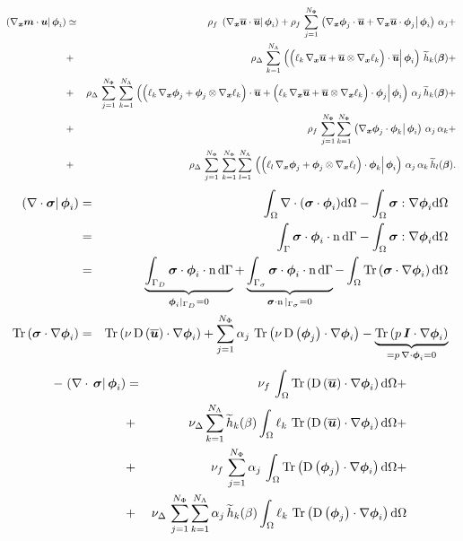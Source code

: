 \documentclass[10pt,a4paper]{article}
\begin{document}
\begin{eqnarray}
\label{eq:convection_phii}
 \prodscal{\grad_{\vx}\vec m \cdot \vu }{\vphi_i}&\simeq & \rho_f \, \prodscal{\grad_{\vx}\bu \cdot \bu}{\vphi_i} + \rho_f \, \sum_{j=1}^{N_\Phi}  \prodscal{\grad_{\vx} \vphi_j\cdot \bu + \grad_{\vx}\bu\cdot \vphi_j }{\vphi_i}
\,\alpha_j  + \\
&+& \rho_\Delta\, \sum_{k=1}^{N_\Lambda}\prodscal{\Big( \ell_k \, \grad_{\vx}\bu+ \bu\otimes\grad_{\vx}\ell_k\Big)\cdot \bu}{\vphi_i}  \, \th_k (\vec \beta)  + \\
&+& \rho_\Delta\, \sum_{j=1}^{N_\Phi} \,\sum_{k=1}^{N_\Lambda} 
 \prodscal{\Big( \ell_k \, \grad_{\vx}\vphi_j+ \vphi_j \otimes\grad_{\vx}\ell_k\Big)\cdot \bu +  \Big( \ell_k \, \grad_{\vx}\bu+ \bu\otimes\grad_{\vx}\ell_k\Big) \cdot \vphi_j }{\vphi_i}\,\alpha_j \, \th_k (\vec \beta) + \\
&+&  \rho_f \, \sum_{j=1}^{N_\Phi} \sum_{k=1}^{N_\Phi}  \prodscal{ \grad_{\vx} \vphi_j\cdot \vphi_k }{\vphi_i}\,\alpha_j \,\alpha_k  + \\
&+& \rho_\Delta\, \sum_{j=1}^{N_\Phi} \,\sum_{k=1}^{N_\Phi} \sum_{l=1}^{N_\Lambda}
\prodscal{\Big( \ell_l \, \grad_{\vx}\vphi_j+ \vphi_j \otimes\grad_{\vx}\ell_l\Big)\cdot \vphi_k }{\vphi_i}\, \alpha_j \, \alpha_k \,\th_l (\vec \beta).
\end{eqnarray}
%
%
\begin{eqnarray}
 \left.\left(\nabla\cdot\boldsymbol{\sigma} \right\vert \boldsymbol{\phi}_i\right)
 &=& \int_\Omega \nabla\cdot(\boldsymbol{\sigma}\cdot\boldsymbol{\phi}_i)\mathrm{d}\Omega - \int_\Omega\boldsymbol{\sigma}:\nabla \boldsymbol{\phi}_i \mathrm{d} \Omega \\
&=&\int_\Gamma \boldsymbol{\sigma}\cdot\boldsymbol{\phi}_i\cdot \operatorname n \mathrm{d} \Gamma- \int_\Omega\boldsymbol{\sigma}:\nabla \boldsymbol{\phi}_i \mathrm{d} \Omega\\
&=&\underbrace{\int_{\Gamma_D} \boldsymbol{\sigma}\cdot\boldsymbol{\phi}_i\cdot \operatorname n \mathrm{d} \Gamma}_{\boldsymbol{\phi}_i\vert_{\Gamma_D} =0}+\underbrace{\int_{\Gamma_\sigma} \boldsymbol{\sigma}\cdot\boldsymbol{\phi}_i\cdot \operatorname n \mathrm{d} \Gamma}_{\boldsymbol{\sigma}\cdot\operatorname n\vert_{\Gamma_\sigma} =0}- \int_\Omega\operatorname{Tr}\left( \boldsymbol{\sigma}\cdot\nabla \boldsymbol{\phi}_i\right)\mathrm{d} \Omega\\
\operatorname{Tr}\left( \boldsymbol{\sigma}\cdot\nabla \boldsymbol{\phi}_i \right)&=& \operatorname{Tr}\left( \nu \operatorname{D}\left( \overline{\boldsymbol{u}}\right)\cdot\nabla \boldsymbol{\phi}_i\right) + \sum_{j =1}^{N_\Phi}\alpha_j\,\operatorname{Tr}\left( \nu \operatorname{D}\left( \boldsymbol{\phi}_j\right)\cdot\nabla \boldsymbol{\phi}_i\right) - \underbrace{\operatorname{Tr}\left( p\,\boldsymbol{I}\cdot\nabla \boldsymbol{\phi}_i\right)}_{=p\,\nabla\cdot \boldsymbol{\phi}_i = 0}\\
\end{eqnarray}
%
%
\begin{eqnarray}
\label{eq:div_sigma_phii}
-\prodscal{\div \,\vsigma}{\vphi_i} &=& \nu_f\,\int_\Omega\trace{\D{\bu}\cdot\grad \vphi_i}\d\Omega + \\
&+& \nu_{\Delta}\sum_{k=1}^{N_\Lambda} \th_k(\beta) \int_\Omega\ell_k \, \trace{\D{\bu}\cdot\grad \vphi_i}\d\Omega + \\
 &+& \nu_f\,\sum_{j =1}^{N_\Phi}\alpha_j\,\int_\Omega \trace{\D{\vphi_j}\cdot\grad \vphi_i} \d \Omega + \\
 &+&  \nu_\Delta\,\sum_{j=1}^{N_\Phi} \sum_{k=1}^{N_\Lambda}  \alpha_j\,\th_k(\beta) \int_\Omega \ell_k \, \trace{\D{\vphi_j}\cdot\grad \vphi_i} \d \Omega \\
\end{eqnarray}
\end{document}
